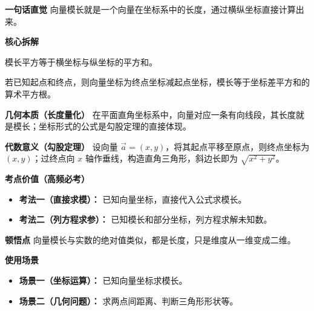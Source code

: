 \begin{explanationbox}
	\textbf{\textcolor{CExplanation}{一句话直觉}}
	向量模长就是一个向量在坐标系中的长度，通过横纵坐标直接计算出来。

	\medskip
	\textbf{\textcolor{CExplanation}{核心拆解}}
	\begin{description}[style=nextline, leftmargin=2.8em, labelsep=0.5em, itemsep=0.45em]
		\item[\textbf{要点一（坐标平方和）：}]
			模长平方等于横坐标与纵坐标的平方和。
		\item[\textbf{要点二（两点坐标差）：}]
			若已知起点和终点，则向量坐标为终点坐标减起点坐标，模长等于坐标差平方和的算术平方根。
	\end{description}

	\medskip
	\textbf{\textcolor{CExplanation}{几何本质（长度量化）}}
	在平面直角坐标系中，向量对应一条有向线段，其长度就是模长；坐标形式的公式是勾股定理的直接体现。

	\medskip
	\textbf{\textcolor{CExplanation}{代数意义（勾股定理）}}
	设向量 $\vec{a}=(x,y)$，将其起点平移至原点，则终点坐标为 $(x,y)$；过终点向 $x$ 轴作垂线，构造直角三角形，斜边长即为 $\sqrt{x^2+y^2}$。

	\medskip
	\textbf{\textcolor{CExplanation}{考点价值（高频必考）}}
	\begin{itemize}[leftmargin=*, itemsep=0.5em, topsep=0.4em]
		\item \textbf{考法一（直接求模）：} 已知向量坐标，直接代入公式求模长。
		\item \textbf{考法二（列方程求参）：} 已知模长和部分坐标，列方程求解未知数。
	\end{itemize}

	\medskip
	\textbf{\textcolor{CExplanation}{顿悟点}}
	向量模长与实数的绝对值类似，都是长度，只是维度从一维变成二维。

	\medskip
	\textbf{\textcolor{CExplanation}{使用场景}}
	\begin{itemize}[leftmargin=*, itemsep=0.5em, topsep=0.4em]
		\item \textbf{场景一（坐标运算）：} 已知向量坐标求模长。
		\item \textbf{场景二（几何问题）：} 求两点间距离、判断三角形形状等。
	\end{itemize}

\end{explanationbox}
